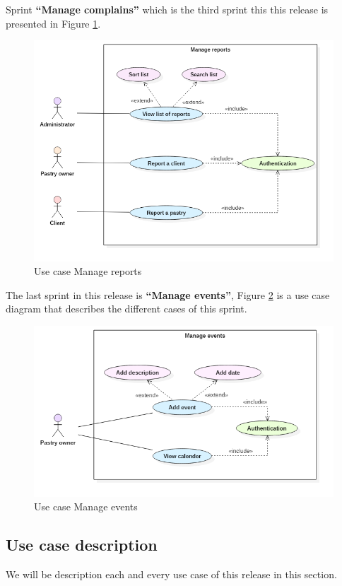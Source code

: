 \documentclass[12pt,a4paper]{report}
\begin{document}
\clearpage
 Sprint \textbf{``Manage complains''} which is the third sprint this this release is presented in Figure \ref{reports-diag}.
 
\begin{figure}[H]
	\centering
	\includegraphics[width=5.4in,keepaspectratio]{manageReports.png}
	\caption{Use case Manage reports}
	\label{reports-diag}
\end{figure}

The last sprint in this release is \textbf{``Manage events''}, Figure \ref{events-diag} is a use case diagram that describes the different cases of this sprint.
\begin{figure}[H]
	\centering
	\includegraphics[width=5.4in,keepaspectratio]{manageEvents.png}
	\caption{Use case Manage events}
	\label{events-diag}
\end{figure}
	\subsection{Use case description}
	We will be description each and every use case of this release in this section.
\end{document}
